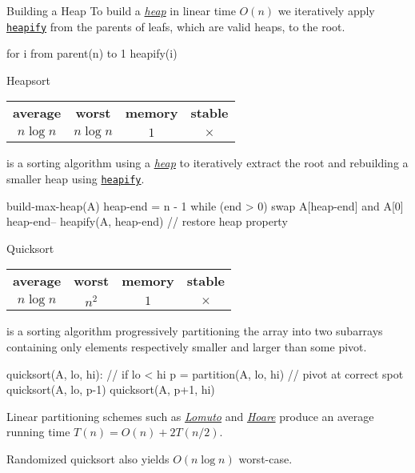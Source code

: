 \documentclass{cognito}
\begin{document}
\begin{note}{Building a Heap} %
	To build a \hyperref[note:Heap]{\it heap} in linear time $O(n)$ we iteratively apply \hyperref[note:Heapify]{\tt heapify}
	from the parents of leafs, which are valid heaps, to the root.
		\begin{largecode}
 for i from parent(n) to 1
 	heapify(i)
	\end{largecode}	
	\vspace{-5pt}
\end{note}


\begin{note}{Heapsort}
	\begin{mdframed}[linecolor=black!25!white]%
	\begin{tabular}{@{} c | c | c | c  @{}}
		\bf average & \bf worst & \bf memory & \bf stable \\
		$n \log n$ & $n \log n$ & $1$ & $\times$
	\end{tabular}%
	\end{mdframed}
	 is a sorting algorithm using a \hyperref[note:Heap]{\it heap}
	to iteratively extract the root and rebuilding a smaller heap using \hyperref[note:Heapify]{\tt heapify}.
	\begin{largecode}
 build-max-heap(A)
 heap-end = n - 1
 while (end > 0) {
 	swap A[heap-end] and A[0]
	heap-end--
	heapify(A, heap-end)  // restore heap property
 }
	\end{largecode}	
	\vspace{-5pt}
\end{note}

\begin{note}{Quicksort}
	\begin{mdframed}[linecolor=black!25!white]%
	\begin{tabular}{@{} c | c | c | c  @{}}
		\bf average & \bf worst & \bf memory & \bf stable \\
		$n \log n$ & $n^2$ & $1$ & $\times$
	\end{tabular}%
	\end{mdframed}
	 is a sorting algorithm progressively partitioning the array
	into two subarrays containing only elements respectively smaller and larger than
	some pivot.
	\begin{largecode}
 quicksort(A, lo, hi):        // if lo < hi
 	p = partition(A, lo, hi)  // pivot at correct spot
	quicksort(A, lo, p-1)
	quicksort(A, p+1, hi)
	\end{largecode}	
	Linear partitioning schemes such as \hyperref[note:Lomuto Partitioning]{\it Lomuto} and \hyperref[note:Hoare Partitioning]{\it Hoare}
	produce an average running time $T(n) = O(n) + 2 T(n/2)$.
	\begin{remark} Randomized quicksort also yields $O(n \log n)$ worst-case. \end{remark}
	\vspace{-5pt}
\end{note}
\end{document}
